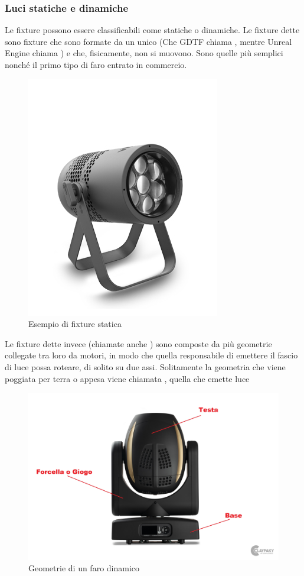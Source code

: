 \documentclass[main.tex]{subfiles}
\begin{document}
\subsubsection{Luci statiche e dinamiche}\label{subsec:1_1_fixtureTypes}
Le fixture possono essere classificabili come statiche o dinamiche. Le fixture dette  sono fixture che sono formate da un unico  (Che GDTF chiama , mentre Unreal Engine chiama ) e che, fisicamente, non si muovono. Sono quelle più semplici nonché il primo tipo di faro entrato in commercio.
\begin{figure}[H]
    \centering
    \includegraphics[width=0.4\linewidth]{img/introduzione/staticFixtureExample.jpg}
    \caption{Esempio di fixture statica}
    \label{fig:staticFixture}
\end{figure}
Le fixture dette invece  (chiamate anche ) sono composte da più geometrie collegate tra loro da motori, in modo che quella responsabile di emettere il fascio di luce possa roteare, di solito su due assi. Solitamente la geometria che viene poggiata per terra o appesa viene chiamata , quella che emette luce 
\begin{figure}[H]
    \centering
    \includegraphics[width=0.75\linewidth]{img/introduzione/dynamicFixtureAnatomy.jpg}
    \caption{Geometrie di un faro dinamico}
    \label{fig:DynamicFixture}
\end{figure}
\end{document}
